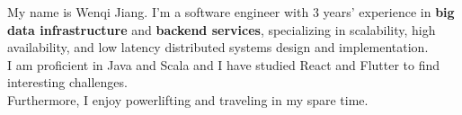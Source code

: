 


My name is Wenqi Jiang. I'm a software engineer with 3 years' experience in \textbf{big data infrastructure} and \textbf{backend services}, specializing in scalability, high availability, and low latency distributed systems design and implementation. \\
I am proficient in  Java and  Scala and I have studied  React and  Flutter to find interesting challenges. \\
Furthermore, I enjoy powerlifting and traveling in my spare time.
